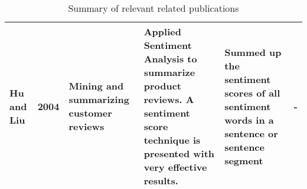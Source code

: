 \documentclass[
	a4paper,
	pdftex,
	12pt,	
	footinclude=true,
	fleqn,
	final,
	]{report}%
\begin{document}
\begin{table}[h!]
{\begin{tabular}{m{3cm}m{1cm}m{4cm}m{8cm}m{3cm}m{3cm}}
Hu and Liu        & 2004 & Mining and summarizing customer reviews                                                                     & Applied Sentiment Analysis to summarize product reviews. A sentiment score technique is presented with very effective results.                                                                                                                                                                                                                              & Summed up the sentiment scores of all sentiment words in a sentence or sentence segment & -                                                                                                                                     \\ \bottomrule
\end{tabular}}
\caption[Summary of most relevant publications]{\small \centering Summary of relevant related publications}
\label{t:8}
\end{table}
\vspace{-0.5cm}
\end{document}
